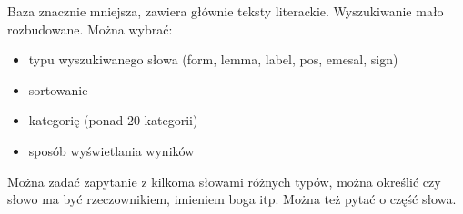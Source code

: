 Baza znacznie mniejsza, zawiera 
głównie teksty literackie. Wyszukiwanie mało rozbudowane. Można wybrać:
\begin{itemize}
 \item typu wyszukiwanego słowa (form, lemma, label, pos, emesal, sign)
 \item sortowanie
 \item kategorię (ponad 20 kategorii)
 \item sposób wyświetlania wyników
\end{itemize}

Można zadać zapytanie z kilkoma słowami różnych typów, można określić czy słowo ma być rzeczownikiem, imieniem boga itp. Można też pytać o część słowa.